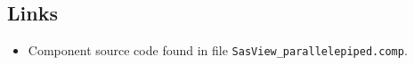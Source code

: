 \subsection*{Links}
\begin{itemize}
  \item Component source code found in file \texttt{SasView\_parallelepiped.comp}.
\end{itemize}
